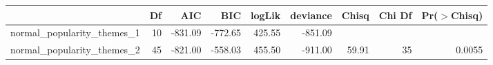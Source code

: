 \begin{table}[ht]
\centering
\begin{tabular}{lrrrrrrrr}
  \hline
 & Df & AIC & BIC & logLik & deviance & Chisq & Chi Df & Pr($>$Chisq) \\ 
  \hline
normal\_popularity\_themes\_1 & 10 & -831.09 & -772.65 & 425.55 & -851.09 &  &  &  \\ 
  normal\_popularity\_themes\_2 & 45 & -821.00 & -558.03 & 455.50 & -911.00 & 59.91 & 35 & 0.0055 \\ 
   \hline
\end{tabular}
\end{table}
